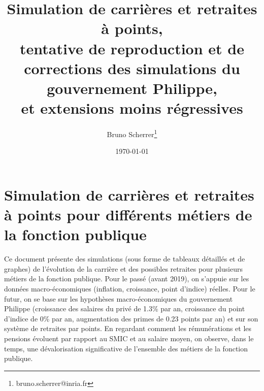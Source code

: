 \documentclass[a4paper,10pt]{report}
\title{Simulation de carrières et retraites à points,\\tentative de reproduction et de corrections des simulations du gouvernement Philippe,\\et extensions moins régressives}
\author{Bruno Scherrer\footnote{bruno.scherrer@inria.fr}}
\date{\today}
\begin{document}
\makeatletter
\renewcommand\tableofcontents{%
    \@starttoc{toc}%
}
\makeatother

\dominitoc


\maketitle

\doclicenseThis


\section*{Simulation de carrières et retraites à points pour différents métiers de la fonction publique}

  Ce document présente des simulations (sous forme de tableaux détaillés et de graphes) de l'évolution de la carrière et des possibles retraites pour plusieurs métiers de la fonction publique. Pour le passé (avant 2019), on s'appuie sur les données macro-économiques (inflation, croissance, point d'indice) réelles. Pour le futur, on se base sur les hypothèses macro-économiques du gouvernement Philippe (croissance des salaires du privé de 1.3\% par an, croissance du point d'indice de 0\% par an, augmentation des primes de 0.23 points par an) et sur son système de retraites par points. En regardant comment les rémunérations et les pensions évoluent par rapport au SMIC et au salaire moyen, on observe, dans le temps, une dévalorisation significative de l'ensemble des métiers de la fonction publique.

\setcounter{tocdepth}{0}
\begingroup
\let\clearpage\relax
\tableofcontents
\endgroup



\end{document}
